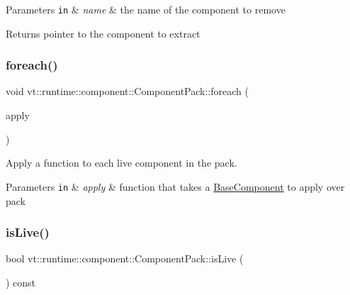 \begin{DoxyParams}[1]{Parameters}
\mbox{\tt in}  & {\em name} & the name of the component to remove\\
\hline
\end{DoxyParams}
\begin{DoxyReturn}{Returns}
pointer to the component to extract 
\end{DoxyReturn}
\mbox{\label{structvt_1_1runtime_1_1component_1_1_component_pack_acb1342053b9e59d0ad0e5ea3d9312424}} 
\subsubsection{\texorpdfstring{foreach()}{foreach()}}
{\footnotesize\ttfamily void vt\+::runtime\+::component\+::\+Component\+Pack\+::foreach (\begin{DoxyParamCaption}\item[{std\+::function$<$ void(\hyperlink{structvt_1_1runtime_1_1component_1_1_base_component}{Base\+Component} $\ast$)$>$}]{apply }\end{DoxyParamCaption})}



Apply a function to each live component in the pack. 


\begin{DoxyParams}[1]{Parameters}
\mbox{\tt in}  & {\em apply} & function that takes a {\ttfamily \hyperlink{structvt_1_1runtime_1_1component_1_1_base_component}{Base\+Component}} to apply over pack \\
\hline
\end{DoxyParams}
\mbox{\label{structvt_1_1runtime_1_1component_1_1_component_pack_a67db159a0ceb87496df4dd40ce9d44b4}} 
\subsubsection{\texorpdfstring{is\+Live()}{isLive()}}
{\footnotesize\ttfamily bool vt\+::runtime\+::component\+::\+Component\+Pack\+::is\+Live (\begin{DoxyParamCaption}{ }\end{DoxyParamCaption}) const\hspace{0.3cm}{\ttfamily [inline]}}




